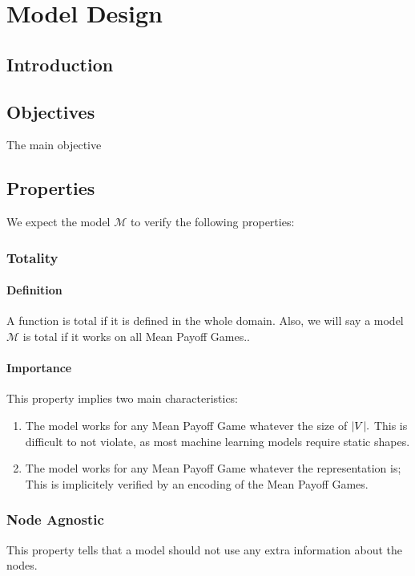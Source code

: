 \chapter{Model Design}

\section{Introduction}

\section{Objectives}
The main objective

\section{Properties}
\label{section:ModelDesign:Properties}
We expect the model $\mathcal{M}$ to verify the following properties:

\subsection{Totality}
\subsubsection{Definition}
A function is total if it is defined in the whole domain.
\newline Also, we will say a model $\mathcal{M}$ is total if it works on all Mean Payoff Games..
\subsubsection{Importance}
This property implies two main characteristics:
\begin{enumerate}
	\item The model works for any Mean Payoff Game whatever the size of $\lvert V \rvert.$ This is difficult to not violate, as most machine learning models require static shapes.
	\item The model works for any Mean Payoff Game whatever the representation is; This is implicitely verified by an encoding of the Mean Payoff Games.
\end{enumerate}

\subsection{Node Agnostic}
This property tells that a model should not use any extra information about the nodes.
